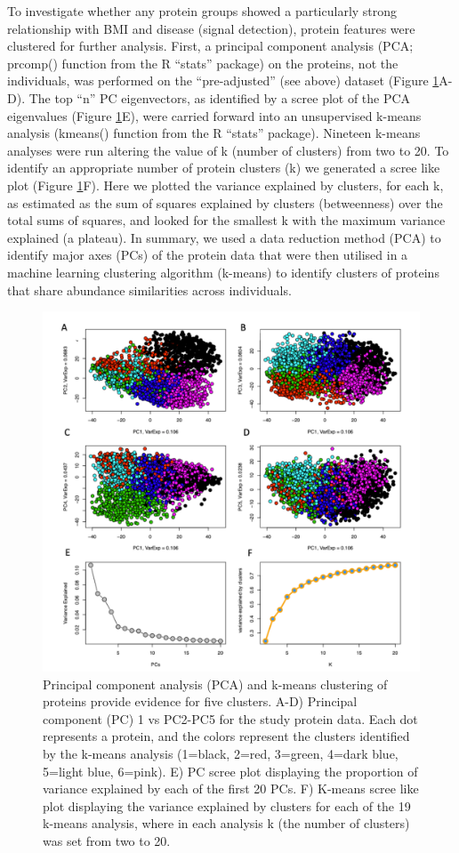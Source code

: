 \documentclass[11pt,twoside]{bristolthesis}
\begin{document}
To investigate whether any protein groups showed a particularly strong relationship with BMI and disease (signal detection), protein features were clustered for further analysis. First, a principal component analysis (PCA; prcomp() function from the R ``stats'' package) on the proteins, not the individuals, was performed on the ``pre-adjusted'' (see above) dataset (Figure \ref{fig:PCs}A-D). The top ``n'' PC eigenvectors, as identified by a scree plot of the PCA eigenvalues (Figure \ref{fig:PCs}E), were carried forward into an unsupervised k-means analysis (kmeans() function from the R ``stats'' package). Nineteen k-means analyses were run altering the value of k (number of clusters) from two to 20. To identify an appropriate number of protein clusters (k) we generated a scree like plot (Figure \ref{fig:PCs}F). Here we plotted the variance explained by clusters, for each k, as estimated as the sum of squares explained by clusters (betweenness) over the total sums of squares, and looked for the smallest k with the maximum variance explained (a plateau). In summary, we used a data reduction method (PCA) to identify major axes (PCs) of the protein data that were then utilised in a machine learning clustering algorithm (k-means) to identify clusters of proteins that share abundance similarities across individuals.
\begin{figure}
\includegraphics[width=0.95\linewidth]{figure/BMI_protein_INTERVAL/PCs2to5v1} \caption[Principal component analysis (PCA) and k-means clustering of proteins]{Principal component analysis (PCA) and k-means clustering of proteins provide evidence for five clusters. A-D) Principal component (PC) 1 vs PC2-PC5 for the study protein data. Each dot represents a protein, and the colors represent the clusters identified by the k-means analysis (1=black, 2=red, 3=green, 4=dark blue, 5=light blue, 6=pink). E) PC scree plot displaying the proportion of variance explained by each of the first 20 PCs. F) K-means scree like plot displaying the variance explained by clusters for each of the 19 k-means analysis, where in each analysis k (the number of clusters) was set from two to 20.}\label{fig:PCs}
\end{figure}
\end{document}
